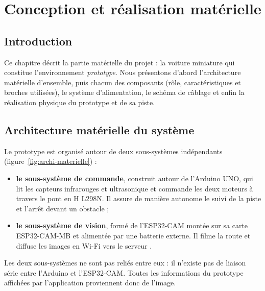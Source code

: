 \chapter{Conception et réalisation matérielle}


\section{Introduction}
Ce chapitre décrit la partie matérielle du projet : la voiture miniature qui constitue l'environnement
\emph{prototype}. Nous présentons d'abord l'architecture matérielle d'ensemble, puis chacun des composants
(rôle, caractéristiques et broches utilisées), le système d'alimentation, le schéma de câblage et enfin la
réalisation physique du prototype et de sa piste.

\section{Architecture matérielle du système}

Le prototype est organisé autour de deux sous-systèmes indépendants (figure~\ref{fig:archi-materielle}) :
\begin{itemize}
  \item \textbf{le sous-système de commande}, construit autour de l'Arduino UNO, qui lit les capteurs infrarouges
        et ultrasonique et commande les deux moteurs à travers le pont en H L298N. Il assure de manière autonome
        le suivi de la piste et l'arrêt devant un obstacle ;
  \item \textbf{le sous-système de vision}, formé de l'ESP32-CAM montée sur sa carte ESP32-CAM-MB et alimentée par
        une batterie externe. Il filme la route et diffuse les images en Wi-Fi vers le serveur \app.
\end{itemize}
Les deux sous-systèmes ne sont pas reliés entre eux : il n'existe pas de liaison série entre l'Arduino et
l'ESP32-CAM. Toutes les informations du prototype affichées par l'application proviennent donc de l'image.


